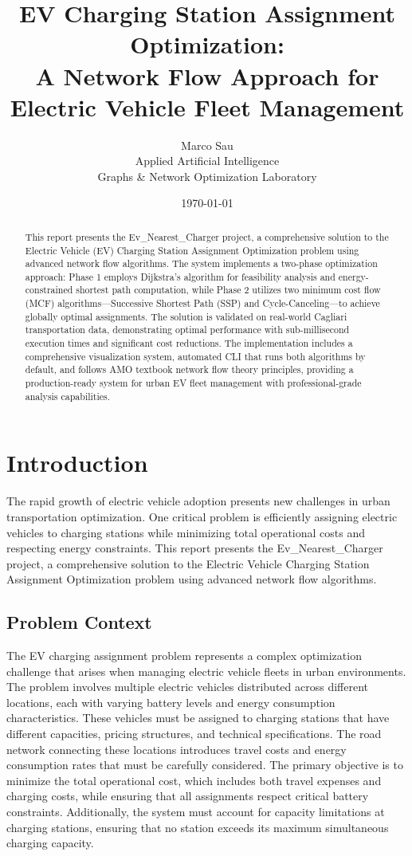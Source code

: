 \documentclass[12pt,a4paper]{article}
\title{\textbf{EV Charging Station Assignment Optimization:\\A Network Flow Approach for Electric Vehicle Fleet Management}}
\author{Marco Sau\\Applied Artificial Intelligence\\Graphs \& Network Optimization Laboratory}
\date{\today}
\begin{document}
\maketitle

\begin{abstract}
This report presents the Ev\_Nearest\_Charger project, a comprehensive solution to the Electric Vehicle (EV) Charging Station Assignment Optimization problem using advanced network flow algorithms. The system implements a two-phase optimization approach: Phase 1 employs Dijkstra's algorithm for feasibility analysis and energy-constrained shortest path computation, while Phase 2 utilizes two minimum cost flow (MCF) algorithms—Successive Shortest Path (SSP) and Cycle-Canceling—to achieve globally optimal assignments. The solution is validated on real-world Cagliari transportation data, demonstrating optimal performance with sub-millisecond execution times and significant cost reductions. The implementation includes a comprehensive visualization system, automated CLI that runs both algorithms by default, and follows AMO textbook network flow theory principles, providing a production-ready system for urban EV fleet management with professional-grade analysis capabilities.
\end{abstract}

\tableofcontents
\newpage

\section{Introduction}

The rapid growth of electric vehicle adoption presents new challenges in urban transportation optimization. One critical problem is efficiently assigning electric vehicles to charging stations while minimizing total operational costs and respecting energy constraints. This report presents the Ev\_Nearest\_Charger project, a comprehensive solution to the Electric Vehicle Charging Station Assignment Optimization problem using advanced network flow algorithms.

\subsection{Problem Context}

The EV charging assignment problem represents a complex optimization challenge that arises when managing electric vehicle fleets in urban environments. The problem involves multiple electric vehicles distributed across different locations, each with varying battery levels and energy consumption characteristics. These vehicles must be assigned to charging stations that have different capacities, pricing structures, and technical specifications. The road network connecting these locations introduces travel costs and energy consumption rates that must be carefully considered. The primary objective is to minimize the total operational cost, which includes both travel expenses and charging costs, while ensuring that all assignments respect critical battery constraints. Additionally, the system must account for capacity limitations at charging stations, ensuring that no station exceeds its maximum simultaneous charging capacity.
\end{document}
